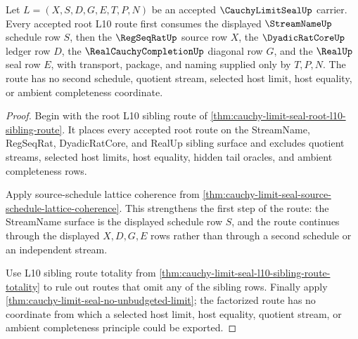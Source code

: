 \begin{theorem}
\label{thm:cauchy-limit-seal-root-source-schedule-lattice-consumption}
Let $L=(X,S,D,G,E,T,P,N)$ be an accepted $\CauchyLimitSealUp$ carrier. Every accepted root L10 route first consumes the displayed $\StreamNameUp$ schedule row $S$, then the $\RegSeqRatUp$ source row $X$, the $\DyadicRatCoreUp$ ledger row $D$, the $\RealCauchyCompletionUp$ diagonal row $G$, and the $\RealUp$ seal row $E$, with transport, package, and naming supplied only by $T,P,N$. The route has no second schedule, quotient stream, selected host limit, host equality, or ambient completeness coordinate.
\end{theorem}
\begin{proof}
Begin with the root L10 sibling route of \autoref{thm:cauchy-limit-seal-root-l10-sibling-route}. It places every accepted root route on the StreamName, RegSeqRat, DyadicRatCore, and RealUp sibling surface and excludes quotient streams, selected host limits, host equality, hidden tail oracles, and ambient completeness rows.

Apply source-schedule lattice coherence from \autoref{thm:cauchy-limit-seal-source-schedule-lattice-coherence}. This strengthens the first step of the route: the StreamName surface is the displayed schedule row $S$, and the route continues through the displayed $X,D,G,E$ rows rather than through a second schedule or an independent stream.

Use L10 sibling route totality from \autoref{thm:cauchy-limit-seal-l10-sibling-route-totality} to rule out routes that omit any of the sibling rows. Finally apply \autoref{thm:cauchy-limit-seal-no-unbudgeted-limit}; the factorized route has no coordinate from which a selected host limit, host equality, quotient stream, or ambient completeness principle could be exported.
\end{proof}

